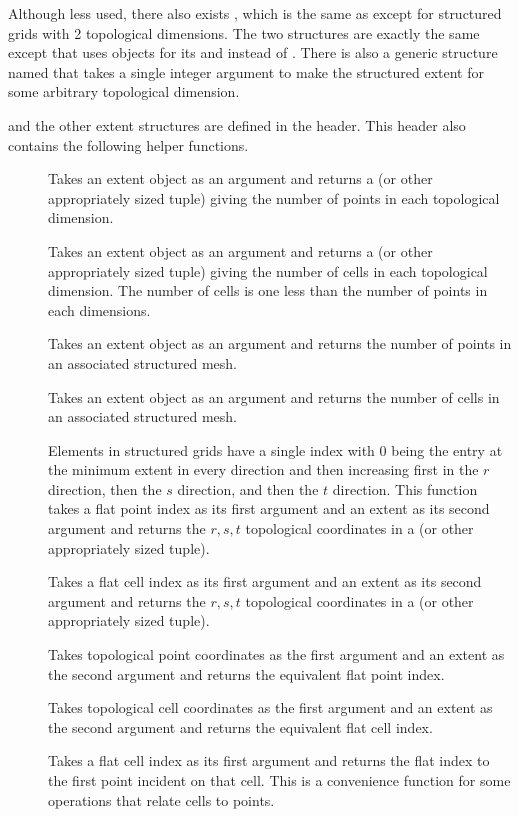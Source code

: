 Although less used, there also exists , which is the same as
 except for structured grids with 2 topological
dimensions. The two structures are exactly the same except that
 uses  objects for its  and
 instead of . There is also a generic structure
named  that takes a single integer argument to make the
structured extent for some arbitrary topological dimension.

 and the other extent structures are defined in the
 header. This header also contains the following
helper functions.

\begin{description}
\item[] Takes an extent object as an argument
  and returns a  (or other appropriately sized tuple) giving the
  number of points in each topological dimension.
\item[] Takes an extent object as an argument
  and returns a  (or other appropriately sized tuple) giving the
  number of cells in each topological dimension. The number of cells is one
  less than the number of points in each dimensions.
\item[] Takes an extent object as an argument
  and returns the number of points in an associated structured mesh.
\item[] Takes an extent object as an argument and
  returns the number of cells in an associated structured mesh.
\item[] Elements in structured
  grids have a single index with 0 being the entry at the minimum extent in
  every direction and then increasing first in the $r$ direction, then the
  $s$ direction, and then the $t$ direction. This function takes a flat
  point index as its first argument and an extent as its second argument
  and returns the ${r,s,t}$ topological coordinates in a  (or
  other appropriately sized tuple).
\item[] Takes a flat cell index as
  its first argument and an extent as its second argument and returns the
  ${r,s,t}$ topological coordinates in a  (or other appropriately
  sized tuple).
\item[] Takes topological point
  coordinates as the first argument and an extent as the second argument
  and returns the equivalent flat point index.
\item[] Takes topological cell
  coordinates as the first argument and an extent as the second argument
  and returns the equivalent flat cell index.
\item[] Takes a flat cell index as its first
  argument and returns the flat index to the first point incident on that
  cell. This is a convenience function for some operations that relate
  cells to points.
\end{description}


